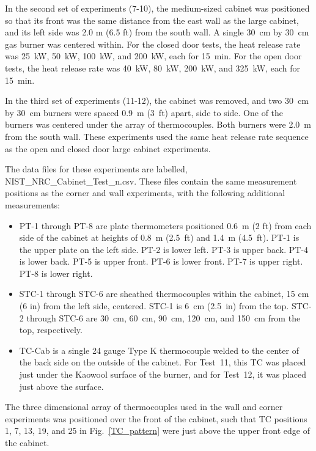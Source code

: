 In the second set of experiments (7-10), the medium-sized cabinet was positioned so that its front was the same distance from the east wall as the large cabinet, and its left side was 2.0 m (6.5 ft) from the south wall. A single 30~cm by 30~cm gas burner was centered within. For the closed door tests, the heat release rate was 25~kW, 50~kW, 100~kW, and 200~kW, each for 15~min. For the open door tests, the heat release rate was 40~kW, 80~kW, 200~kW, and 325~kW, each for 15~min.

In the third set of experiments (11-12), the cabinet was removed, and two 30~cm by 30~cm burners were spaced 0.9~m (3~ft) apart, side to side. One of the burners was centered under the array of thermocouples. Both burners were 2.0~m from the south wall. These experiments used the same heat release rate sequence as the open and closed door large cabinet experiments.

The data files for these experiments are labelled, {\ct NIST\_NRC\_Cabinet\_Test\_n.csv}. These files contain the same measurement positions as the corner and wall experiments, with the following additional measurements:
\begin{itemize}
\item PT-1 through PT-8 are plate thermometers positioned 0.6~m (2 ft) from each side of the cabinet at heights of 0.8~m (2.5~ft) and 1.4~m (4.5~ft). PT-1 is the upper plate on the left side. PT-2 is lower left. PT-3 is upper back. PT-4 is lower back. PT-5 is upper front. PT-6 is lower front. PT-7 is upper right. PT-8 is lower right.
\item STC-1 through STC-6 are sheathed thermocouples within the cabinet, 15 cm (6 in) from the left side, centered. STC-1 is 6~cm (2.5~in) from the top. STC-2 through STC-6 are 30~cm, 60~cm, 90~cm, 120~cm, and 150~cm from the top, respectively.
\item TC-Cab is a single 24 gauge Type K thermocouple welded to the center of the back side on the outside of the cabinet. For Test~11, this TC was placed just under the Kaowool surface of the burner, and for Test~12, it was placed just above the surface.
\end{itemize}
The three dimensional array of thermocouples used in the wall and corner experiments was positioned over the front of the cabinet, such that TC positions 1, 7, 13, 19, and 25 in Fig.~\ref{TC_pattern} were just above the upper front edge of the cabinet.

